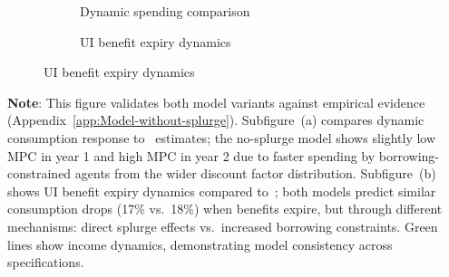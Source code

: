 \documentclass{econsocart}
\begin{document}
\begin{figure}[H]
  \centering
  \caption{\pregenmark Validation moments in models with and without splurge}
  \label{fig:untargetedMoments_wSplZero} %
  \noindent\begin{minipage}{\textwidth}
    \centering
    \begin{subfigure}[b]{.48\linewidth}
      \centering
      \caption{Dynamic spending comparison}
      \label{fig:USaggmpclotterywin_wSplZero} %
    \end{subfigure}
    \begin{subfigure}[b]{.48\linewidth}
      \centering
      \caption{UI benefit expiry dynamics}
      \label{fig:expiryUI_wSplZero} %
    \end{subfigure}
  \end{minipage}
\end{figure}
\noindent\parbox{\textwidth}{\footnotesize
  \textbf{Note}: This figure validates both model variants against empirical evidence (Appendix~\ref{app:Model-without-splurge}).
  Subfigure~(a) compares dynamic consumption response to~\cite{fagereng-mpc-2021} estimates;
  the no-splurge model shows slightly low MPC in year 1 and high MPC in year 2 due to
  faster spending by borrowing-constrained agents from the wider discount factor distribution.
  Subfigure~(b) shows UI benefit expiry dynamics compared to~\cite{ganongConsumer2019};
  both models predict similar consumption drops (17\% vs.\ 18\%) when benefits expire,
  but through different mechanisms: direct splurge effects vs.\ increased borrowing constraints.
  Green lines show income dynamics, demonstrating model consistency across specifications.
}

\vspace{2em}  %
\end{document}
